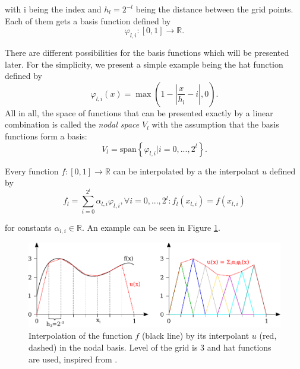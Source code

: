 with i being the index and $ h_l = 2^{-l} $ being the distance between the grid points. Each of them gets a basis function defined by 
\begin{equation}
	\varphi_{l,i}: [0,1] \rightarrow \mathbb{R}.
\end{equation}

There are different possibilities for the basis functions which will be presented later. For the simplicity, we present a simple example being the hat function defined by
\begin{equation}
	\varphi_{l,i}(x) = \max\left(1- \left|\frac{x}{h_l}-i\right|, 0\right).
\end{equation}
All in all, the space of functions that can be presented exactly by a linear combination is called the \textit{nodal space} $V_l$ with the assumption that the basis functions form a basis:
\begin{equation}
	V_l = \text{span}\left\{ \varphi_{l,i} | i = 0,...,2^l\right\}. 
\end{equation}

Every function $f: [0,1] \rightarrow \mathbb{R}$ can be interpolated by a the interpolant $ u $ defined by
\begin{equation}
	f_l = \sum_{i=0}^{2^l}\alpha_{l,i} \varphi_{l,i}, \forall i = 0,...,2^l: f_l(x_{l,i}) = f(x_{l,i})
\end{equation}

for constants $ \alpha_{l,i} \in \mathbb{R} $. An example can be seen in Figure \ref{fig:interpolant}.


\begin{figure}[H]
	\centering
	\includegraphics[width=\textwidth]{figures/Fig_2_5_interpolant}
	\caption{  Interpolation of the function $ f $ (black line) by its interpolant $ u $ (red, dashed) in the nodal basis. Level of the grid is 3 and hat functions are used, inspired from \cite{pfluger2010spatially}.}
	\label{fig:interpolant}
\end{figure}


